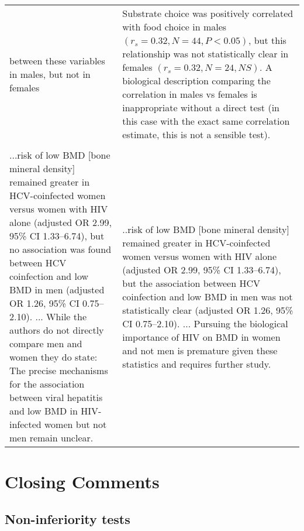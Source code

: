 \begin{tabular}{p{7.5cm}p{7.5cm}}
        between these variables in males, but not in females & 
        Substrate choice was positively correlated with food choice in males $(r_{s} = 0.32, N = 44, P < 0.05)$, but this
        relationship was not statistically clear in females $(r_{s} = 0.32, N = 24, NS)$. A biological description comparing 
        the correlation in males vs females is inappropriate without a direct test (in this case with the exact same 
        correlation estimate, this is not a sensible test). \\
        \\
        ...risk of low BMD [bone mineral density] remained greater in HCV-coinfected women versus women with HIV alone
        (adjusted OR 2.99, 95\% CI 1.33–6.74), but no association was found between HCV coinfection and low BMD in men 
        (adjusted OR 1.26, 95\% CI 0.75–2.10). ... While the authors do not directly compare men and women they do state: 
        The precise mechanisms for the association between viral hepatitis and low BMD in HIV-infected women but not men 
        remain unclear. & 
        ..risk of low BMD [bone mineral density] remained greater in HCV-coinfected women versus women with HIV alone
        (adjusted OR 2.99, 95\% CI 1.33–6.74), but the association between HCV coinfection and low BMD in men was not
        statistically clear (adjusted OR 1.26, 95\% CI 0.75–2.10). ... Pursuing the biological importance of HIV on BMD in 
        women and not men is premature given these statistics and requires further study.
        \\
\end{tabular}

\section*{Closing Comments}

\subsection*{Non-inferiority tests}

